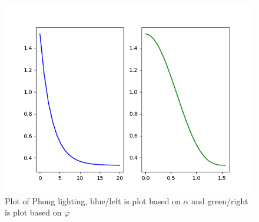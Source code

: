 \documentclass{article}
\begin{document}
\begin{figure}[H]
    \centering
    \includegraphics[width=1\textwidth]{phong.png} 
    \caption{Plot of Phong lighting, blue/left is plot based on $\alpha$ and green/right is plot based on $\varphi$}
    \label{fig:pho}
\end{figure}




    \newpage
    \printbibliography
\end{document}
